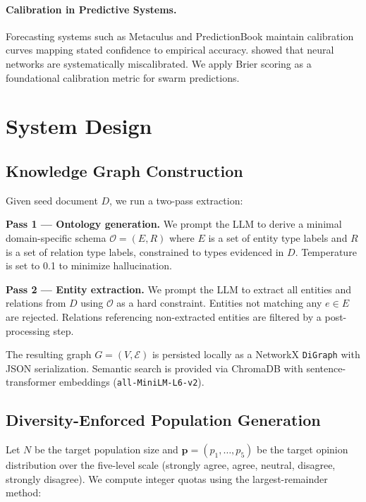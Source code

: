 \documentclass[10pt,twocolumn]{article}
\begin{document}
\paragraph{Calibration in Predictive Systems.} Forecasting systems such as Metaculus and PredictionBook maintain calibration curves mapping stated confidence to empirical accuracy. \citet{guo2017calibration} showed that neural networks are systematically miscalibrated. We apply Brier scoring \cite{brier1950verification} as a foundational calibration metric for swarm predictions.

\section{System Design}

\subsection{Knowledge Graph Construction}

Given seed document $D$, we run a two-pass extraction:

\textbf{Pass 1 — Ontology generation.} We prompt the LLM to derive a minimal domain-specific schema $\mathcal{O} = (E, R)$ where $E$ is a set of entity type labels and $R$ is a set of relation type labels, constrained to types evidenced in $D$. Temperature is set to 0.1 to minimize hallucination.

\textbf{Pass 2 — Entity extraction.} We prompt the LLM to extract all entities and relations from $D$ using $\mathcal{O}$ as a hard constraint. Entities not matching any $e \in E$ are rejected. Relations referencing non-extracted entities are filtered by a post-processing step.

The resulting graph $G = (V, \mathcal{E})$ is persisted locally as a NetworkX \texttt{DiGraph} with JSON serialization. Semantic search is provided via ChromaDB with sentence-transformer embeddings (\texttt{all-MiniLM-L6-v2}).

\subsection{Diversity-Enforced Population Generation}

Let $N$ be the target population size and $\mathbf{p} = (p_1, \ldots, p_5)$ be the target opinion distribution over the five-level scale (strongly agree, agree, neutral, disagree, strongly disagree). We compute integer quotas using the largest-remainder method:
\end{document}
